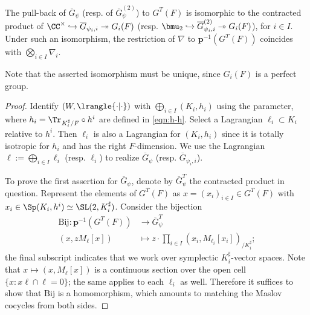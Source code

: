 \documentclass[a4paper,10pt]{article}
\begin{document}
\begin{lemma}\label{prop:metaplectic-reduction}
	The pull-back of $\overline{G}_\psi$ (resp. of $\overline{G}_\psi^{(2)}$) to $G^T(F)$ is isomorphic to the contracted product of $\CC^\times \hookrightarrow \overline{G}_{\psi_i, i} \twoheadrightarrow G_i(F)$ (resp. $\bmu_2 \hookrightarrow \overline{G}^{(2)}_{\psi_i, i} \twoheadrightarrow G_i(F)$), for $i \in I$. Under such an isomorphism, the restriction of $\nabla$ to $\bm{p}^{-1}(G^T(F))$ coincides with $\bigotimes_{i \in I} \nabla_i$.
\end{lemma}
Note that the asserted isomorphism must be unique, since $G_i(F)$ is a perfect group.
\begin{proof}
	Identify $(W, \lrangle{\cdot|\cdot})$ with $\bigoplus_{i \in I} (K_i, h_i)$ using the parameter, where $h_i = \Tr_{K_i^\sharp/F} \circ h^i$ are defined in \eqref{eqn:h-h}. Select a Lagrangian $\ell_i \subset K_i$ relative to $h^i$. Then $\ell_i$ is also a Lagrangian for $(K_i, h_i)$ since it is totally isotropic for $h_i$ and has the right $F$-dimension. We use the Lagrangian $\ell := \bigoplus_{i \in I} \ell_i$ (resp. $\ell_i$) to realize $\overline{G}_\psi$ (resp. $\overline{G}_{\psi_i, i}$).
	
	To prove the first assertion for $\overline{G}_\psi$, denote by $\overline{G}^T_\psi$ the contracted product in question. Represent the elements of $G^T(F)$ as $x = (x_i)_{i \in I} \in G^T(F)$ with $x_i \in \Sp(K_i, h^i) \simeq \SL(2, K_i^\sharp)$. Consider the bijection
	\begin{align*}
		\text{Bij}: \bm{p}^{-1}(G^T(F)) & \longrightarrow \overline{G}^T_\psi \\
		(x, zM_\ell[x]) & \longmapsto z \cdot \prod_{i \in I} (x_i, M_{\ell_i}[x_i])_{/K_i^\sharp};
	\end{align*}
	the final subscript indicates that we work over symplectic $K_i^\sharp$-vector spaces. Note that $x \mapsto (x, M_\ell[x])$ is a continuous section over the open cell $\{x: x\ell \cap \ell = 0 \}$; the same applies to each $\ell_i$ as well. Therefore it suffices to show that $\text{Bij}$ is a homomorphism, which amounts to matching the Maslov cocycles from both sides.
	

\end{proof}
\end{document}

